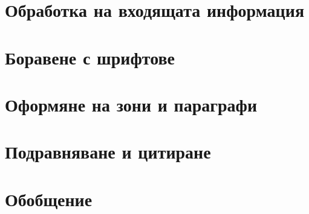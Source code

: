 \section{Обработка на входящата информация}



\section{Боравене с шрифтове}



\section{Оформяне на зони и параграфи}



\section{Подравняване и цитиране}



\section*{Обобщение}



